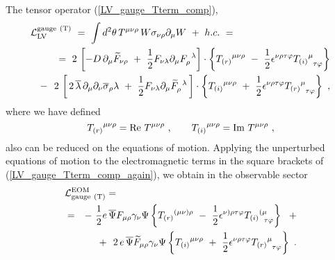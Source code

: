 \documentclass[12pt]{revtex4}
\begin{document}
The tensor operator (\ref{LV_gauge_Tterm_comp}),
\begin{eqnarray}
\nonumber
\lefteqn{
\mathcal{L}_{\mathrm{LV}}^{\mathrm{gauge\ (T)}}  ~=~ 
\int d^2\theta \, T^{\mu\nu\rho} \,
        W \sigma_{\nu\rho} \partial_\mu W  ~+~ h.c. ~=~ } \\
\label{LV_gauge_Tterm_comp_again}
        &&
        =~
2\,
\left[
   - D\, \partial_\mu \widetilde{F}_{\nu\rho} 
   ~+~
   \frac{1}{2}
   F_{\nu\lambda}\partial_\mu F_\rho^{\phantom{\rho}\lambda}
\right] 
\cdot
\left\{
{T_{(r)}}^{\mu\nu\rho} 
~-~
\frac{1}{2} \epsilon^{\nu\rho\tau\varphi}
{T_{(i)}}^\mu_{\phantom{\mu}\tau\varphi}
\right\}
\\
\nonumber
        &&
        -~~
2\,
\left[\,
    2\, \overline{\lambda}\, \partial_\mu \partial_\nu
    \overline{\sigma}_\rho \lambda
    ~+~
    \frac{1}{2} F_{\nu\lambda} \partial_\mu
    \widetilde{F}_\rho^{\phantom{\rho}\lambda}
    \,
\right]
\cdot
\left\{
   {T_{(i)}}^{\mu\nu\rho} 
   ~+~
   \frac{1}{2} \epsilon^{\nu\rho\tau\varphi}
   {T_{(r)}}^\mu_{\phantom{\mu}\tau\varphi}
\right\}~,
\end{eqnarray}
        where we have defined
\begin{equation}
\nonumber
 {T_{(r)}}^{\mu\nu\rho}  =  {\rm Re}~ T^{\mu\nu\rho}~, 
\qquad
 {T_{(i)}}^{\mu\nu\rho}  =  {\rm Im}~ T^{\mu\nu\rho}~, 
\end{equation}
        also can be reduced on the equations of motion.
Applying the unperturbed equations of motion to the 
electromagnetic terms in the square brackets of 
(\ref{LV_gauge_Tterm_comp_again}), we obtain in the
observable sector
\begin{eqnarray}
\nonumber
        \lefteqn{
        \mathcal{L}_{\rm gauge\ (T)}^{\rm EOM} = } \\
\label{LV_induced_by_gauge_T}
& = &
-~ \frac{1}{2} e \, \overline{\Psi} F_{\mu\rho} 
                    \gamma_\nu \Psi 
\left\{
{T_{(r)}}^{(\mu\nu)\rho} 
~-~
\frac{1}{2} \epsilon^{\nu)\rho\tau\varphi}
{T_{(i)}}^{(\mu}_{\phantom{\mu}\tau\varphi}
\right\}
~~+
\\
\nonumber
&&
+~~
2\, 
e\, \overline{\Psi} \widetilde{F}_{\mu\rho}
        \gamma_\nu \Psi
\left\{
   {T_{(i)}}^{\mu\nu\rho} 
   ~+~
   \frac{1}{2} \epsilon^{\nu\rho\tau\varphi}
   {T_{(r)}}^\mu_{\phantom{\mu}\tau\varphi}
\right\}~.
\end{eqnarray}
\end{document}
